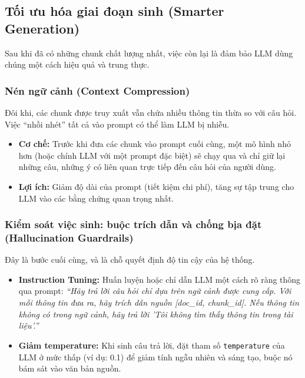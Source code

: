 \subsection{Tối ưu hóa giai đoạn sinh (Smarter Generation)}
\label{ssec:smarter_aug_gen}
Sau khi đã có những chunk chất lượng nhất, việc còn lại là đảm bảo LLM dùng chúng một cách hiệu quả và trung thực.

\subsubsection{Nén ngữ cảnh (Context Compression)}
Đôi khi, các chunk được truy xuất vẫn chứa nhiều thông tin thừa so với câu hỏi. Việc “nhồi nhét” tất cả vào prompt có thể làm LLM bị nhiễu.
\begin{itemize}
	\item \textbf{Cơ chế:} Trước khi đưa các chunk vào prompt cuối cùng, một mô hình nhỏ hơn (hoặc chính LLM với một prompt đặc biệt) sẽ chạy qua và chỉ giữ lại những câu, những ý có liên quan trực tiếp đến câu hỏi của người dùng.
	\item \textbf{Lợi ích:} Giảm độ dài của prompt (tiết kiệm chi phí), tăng sự tập trung cho LLM vào các bằng chứng quan trọng nhất.
\end{itemize}

\subsubsection{Kiểm soát việc sinh: buộc trích dẫn và chống bịa đặt (Hallucination Guardrails)}
Đây là bước cuối cùng, và là chỗ quyết định độ tin cậy của hệ thống.
\begin{itemize}
	\item \textbf{Instruction Tuning:} Huấn luyện hoặc chỉ dẫn LLM một cách rõ ràng thông qua prompt: \textit{“Hãy trả lời câu hỏi chỉ dựa trên ngữ cảnh được cung cấp. Với mỗi thông tin đưa ra, hãy trích dẫn nguồn [doc\_id, chunk\_id]. Nếu thông tin không có trong ngữ cảnh, hãy trả lời 'Tôi không tìm thấy thông tin trong tài liệu'.”}
	\item \textbf{Giảm temperature:} Khi sinh câu trả lời, đặt tham số \texttt{temperature} của LLM ở mức thấp (ví dụ: 0.1) để giảm tính ngẫu nhiên và sáng tạo, buộc nó bám sát vào văn bản nguồn.
\end{itemize}